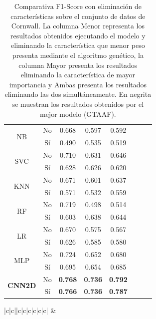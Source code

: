 \documentclass{uathesis-es}
\begin{document}
{\begin{table}[H]
\begin{center}
\begin{tabular}{|c|c||c|c|c|c|c|c|}
        \multirow{2}{*}{NB} &
            No & 0.668 & 0.597 & 0.592\\ &
            Sí  & 0.490 & 0.535 & 0.519 \\ \hline \hline
        \multirow{2}{*}{SVC} &
            No & 0.710 & 0.631 & 0.646\\ &
            Sí  & 0.628 & 0.626 & 0.620 \\ \hline \hline
        \multirow{2}{*}{KNN} &
            No & 0.671 & 0.601 & 0.637\\ &
            Sí  & 0.571 & 0.532 & 0.559 \\ \hline \hline
        \multirow{2}{*}{RF} &
            No & 0.719 & 0.498 & 0.514\\ &
            Sí  & 0.603 & 0.638 & 0.644 \\ \hline \hline
        \multirow{2}{*}{LR} &
            No & 0.670 & 0.575 & 0.567\\ &
            Sí  & 0.626 & 0.585 & 0.580 \\ \hline \hline
        \multirow{2}{*}{MLP} &
            No & 0.724 & 0.652 & 0.680\\ &
            Sí  & 0.695 & 0.654 & 0.685 \\ \hline \hline
        \multirow{2}{*}{\textbf{CNN2D}} &
            No & \textbf{0.768} & \textbf{0.736} & \textbf{0.792}\\ &
            Sí  & \textbf{0.766} & \textbf{0.736} & \textbf{0.787} \\ \hline \hline
        \end{tabular}
    \end{center}
    \caption{Comparativa F1-Score con eliminación de características sobre el conjunto de datos de Cornwall. La columna Menor representa los resultados obtenidos ejecutando el modelo y eliminando la característica que menor peso presenta mediante el algoritmo genético, la columna Mayor presenta los resultados eliminando la característica de mayor importancia y Ambas presenta los resultados eliminando las dos simultáneamente. En negrita se muestran los resultados obtenidos por el mejor modelo (GTAAF).}
    \label{CornwallLoss}
\end{table}


\begin{table}[H]
    \begin{center}
        \begin{tabular}{|c|c||c|c|c|c|c|c|}
        \hline
         &
         \\ \hline


\end{tabular}
\end{center}
\end{table}}
\end{document}
